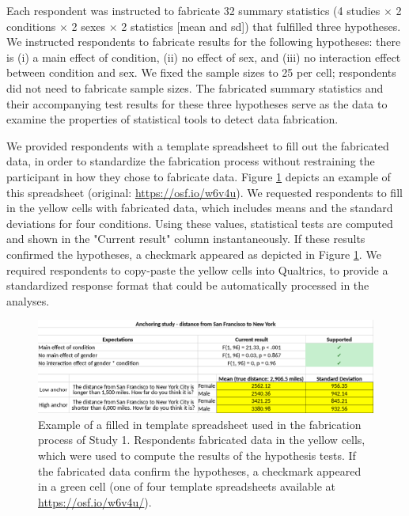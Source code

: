 \documentclass{article}
\begin{document}
Each respondent was instructed to fabricate 32 summary statistics (4 studies $\times$ 2 conditions $\times$ 2 sexes $\times$ 2 statistics [mean and sd]) that fulfilled three hypotheses. We instructed respondents to fabricate results for the following hypotheses: there is (i) a main effect of condition, (ii) no effect of sex, and (iii) no interaction effect between condition and sex. We fixed the sample sizes to 25 per cell; respondents did not need to fabricate sample sizes. The fabricated summary statistics and their accompanying test results for these three hypotheses serve as the data to examine the properties of statistical tools to detect data fabrication.

We provided respondents with a template spreadsheet to fill out the fabricated data, in order to standardize the fabrication process without restraining the participant in how they chose to fabricate data. Figure \ref{fig1} depicts an example of this spreadsheet (original:  \url{https://osf.io/w6v4u}). We requested respondents to fill in the yellow cells with fabricated data, which includes means and the standard deviations for four conditions. Using these values, statistical tests are computed and shown in the "Current result" column instantaneously. If these results confirmed the hypotheses, a checkmark appeared as depicted in Figure \ref{fig1}. We required respondents to copy-paste the yellow cells into Qualtrics, to provide a standardized response format that could be automatically processed in the analyses.

\begin{figure}
\begin{center}
\includegraphics[width=\textwidth,height=\textheight,keepaspectratio]{../figures/spreadsheet.png}
\caption{Example of a filled in template spreadsheet used in the fabrication process of Study 1. Respondents fabricated data in the yellow cells, which were used to compute the results of the hypothesis tests. If the fabricated data confirm the hypotheses, a checkmark appeared in a green cell (one of four template spreadsheets available at \url{https://osf.io/w6v4u/}).}
\label{fig1}
\end{center}
\end{figure}
\end{document}
